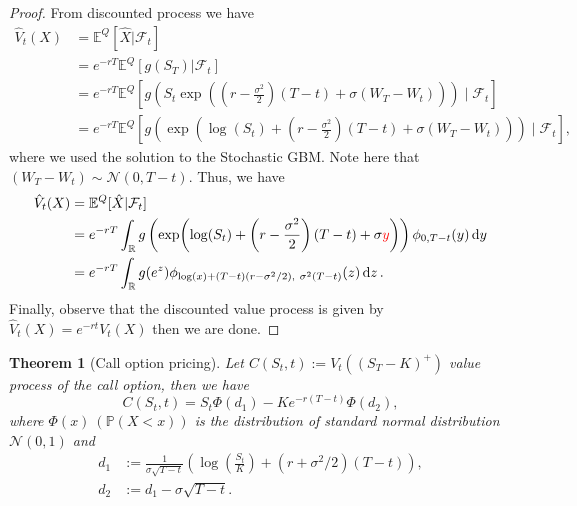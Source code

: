 \documentclass[10pt]{article}
\theoremstyle{remark}
\theoremstyle{plain}
\newtheorem{Theorem}{Theorem}[section]
\newcommand{\R}{\mathbb{R}}
\newcommand{\E}{\mathbb{E}}
\numberwithin{equation}{section}
\begin{document}
\begin{proof}
	From discounted process we have
	\begin{align*}
		\hat{V}_t(X) &= \E^Q [\hat{X}|\mathcal{F}_t] 
		\\
		& = e^{-rT}  \E^Q [g(S_T)|\mathcal{F}_t] 
		\\
		& =  e^{-rT}  \E^Q \left[g \left( S_t \exp(\left(r - \frac{\sigma^2}{2}\right)(T-t) + \sigma(W_T - W_t))  \right)\mid \mathcal{F}_t\right]
		\\
		& = e^{-rT}  \E^Q \left[g \left( \exp(\log(S_t) + \left(r - \frac{\sigma^2}{2}\right)(T-t) + \sigma(W_T - W_t))  \right)\mid \mathcal{F}_t\right], 
	\end{align*}
	where we used the solution to the Stochastic GBM. Note here that $(W_T - W_t) \sim \mathcal{N}(0, T-t)$. Thus, we have 
	\begin{align*}
		\hat{V}_t(X) &= \E^Q [\hat{X}|\mathcal{F}_t] 
		\\
		& = e^{-rT}  \int_\R g \left( \exp(\log(S_t) + \left(r - \frac{\sigma^2}{2}\right)(T-t) + \sigma {\color{red} y})  \right) \phi_{0, T-t} (y) \dd{y}
		\\
		& =  e^{-rT}  \int_\R g(e^z)  \phi_{\log(x)+ (T-t)(r-\sigma^2/2),\ \sigma^2(T-t)} (z) \dd{z}.
	\end{align*}
	Finally, observe that the discounted value process is given by $\hat{V}_t(X) = e^{-rt} V_t(X)$ then we are done.
\end{proof}

\begin{Theorem}[Call option pricing]\label{BS_Call}
	Let $C(S_t, t) := V_t((S_T-K)^+)$ value process of the call option, then we have
	\begin{equation}
		C(S_t, t) = S_t \Phi(d_1) - K e^{-r(T-t)} \Phi(d_2),
	\end{equation}
	where $\Phi(x)\ (\mathbb{P} (X < x) )$ is the distribution of standard normal distribution $\mathcal{N}(0,1)$ and
	\begin{align*}
		d_1 & := \frac{1}{\sigma \sqrt{T-t}} \left(\log(\frac{S_t}{K}) + (r+\sigma^2/2)(T-t) \right),\\
		d_2 & := d_1 - \sigma \sqrt{T-t}.
	\end{align*}
\end{Theorem}
\end{document}
